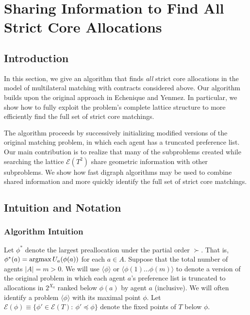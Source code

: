 \documentclass[11pt,reqno]{amsart}
\theoremstyle{definition}
\numberwithin{equation}{section}
\newcommand{\argmax}{\operatornamewithlimits{argmax}}
\newcommand{\lag}{\langle}
\newcommand{\rag}{\rangle}
\newcommand{\pre}{\phi}
\newcommand{\fix}{\mathcal{E}}
\newcommand{\peq}{\preceq}
\newcommand{\su}{\succ}
\begin{document}
\section{Sharing Information to Find All Strict Core Allocations}
\subsection{Introduction}
In this section, we give an algorithm that finds \emph{all} strict core allocations in the model of multilateral matching with contracts considered above.
Our algorithm builds upon the original approach in Echenique and Yenmez.
In particular, we show how to fully exploit the problem's complete lattice structure to more efficiently find the full set of strict core matchings. 

The algorithm proceeds by successively initializing modified versions of the original matching problem, in which each agent has a truncated preference list.
Our main contribution is to realize that many of the subproblems created while searching the lattice $\fix(T^2)$ share geometric information with other subproblems.
We show how fast digraph algorithms may be used to combine shared information and more quickly identify the full set of strict core matchings. 

\subsection{Intuition and Notation} \label{section:description1}
\subsubsection{Algorithm Intuition}
Let $\pre^*$ denote the largest preallocation under the partial order $\su$.
That is, $\pre^*(a) = \argmax U_a(\pre(a))$ for each $a \in A$.
Suppose that the total number of agents $|A| = m > 0$.
We will use $\langle \pre \rangle$ or $\langle \pre(1) \hdots \pre(m) \rangle$  to denote a version of the original problem in which each agent $a$'s preference list is truncated to allocations in $2^{X_a}$ ranked below $\pre(a)$ by agent $a$ (inclusive). 
We will often identify a problem $\lag \pre \rag$ with its maximal point $\pre$.
Let $\fix(\pre) \equiv \{\pre' \in \fix(T): \: \pre' \peq \pre\}$ denote the fixed points of $T$ below $\pre$.  
\end{document}
